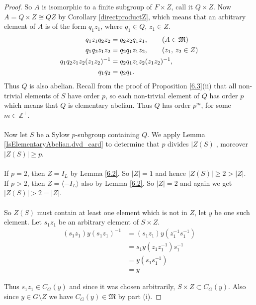 \begin{proof}
  So $A$ is isomorphic to a finite subgroup of $F \times Z$, call it $Q \times Z$. Now $A = Q \times Z \cong QZ$ by Corollary \ref{directproductZ}, which means that an arbitrary element of $A$ is of the form $q_1z_1$, where $q_1 \in Q$, $z_1 \in Z$.
  \begin{align*} q_1z_1q_2z_2 &= q_2z_2 q_1z_1, \tag{$A \in \mathfrak{M}$}
  \\ q_1q_2z_1z_2 &= q_2q_1z_1z_2, \tag{$z_1$, $z_2 \in Z$}
  \\  q_1q_2z_1z_2(z_1z_2)^{-1} &= q_2q_1z_1z_2(z_1z_2)^{-1},
  \\ q_1q_2 &= q_2q_1.
  \end{align*}
  Thus $Q$ is also abelian. Recall from the proof of Proposition \ref{6.3}(ii) that all non-trivial elements of $S$ have order $p$, so each non-trivial element of $Q$ has order $p$ which means that $Q$ is elementary abelian. Thus $Q$ has order $p^m$, for some $m \in \mathbb{Z}^+$. \\
  \\
  Now let $S$ be a Sylow $p$-subgroup containing $Q$. We apply Lemma \ref{IsElementaryAbelian.dvd_card} to determine that $p$ divides $|Z(S)|$, moreover $|Z(S)| \geq p$. \\
  \\
  If $p=2$, then $Z=I_L$ by Lemma \ref{6.2}. So $|Z| = 1$ and hence $|Z(S)| \geq 2 > |Z|$.\\
  If $p > 2$, then  $Z = \langle - I_L \rangle$ also by Lemma \ref{6.2}. So $|Z| = 2$ and again we get $|Z(S)| > 2 = |Z|$. \\
  \\
  So $Z(S)$ must contain at least one element which is not in $Z$, let $y$ be one such element. Let $s_1z_1$ be an arbitrary element of $S \times Z$.
  \begin{align*}
  (s_1z_1)y(s_1z_1)^{-1} &= (s_1z_1)y(z_1^{-1}s_1^{-1})
  \\ &= s_1y(z_1z_1^{-1})s_1^{-1} \tag{since $y \in L$, $z_1 \in Z$}
  \\ &= y(s_1s_1^{-1}) \tag{since $s_1 \in S$, $y \in Z(S)$}
  \\ &= y
  \end{align*}
  
  Thus $s_1z_1 \in C_G(y)$ and since it was chosen arbitrarily, $S \times Z \subset C_G(y)$. Also since $y \in G \! \setminus \! Z$ we have $C_G(y) \in \mathfrak{M}$ by part (i).
\end{proof}
